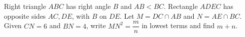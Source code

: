 Right triangle $ABC$ has right angle $B$ and $AB<BC$. Rectangle $ADEC$ has opposite sides $AC,DE$, with $B$ on $DE$. Let $M=DC\cap AB$ and $N=AE\cap BC$. Given $CN=6$ and $BN=4$, write $MN^2=\dfrac{m}{n}$ in lowest terms and find $m+n$.
